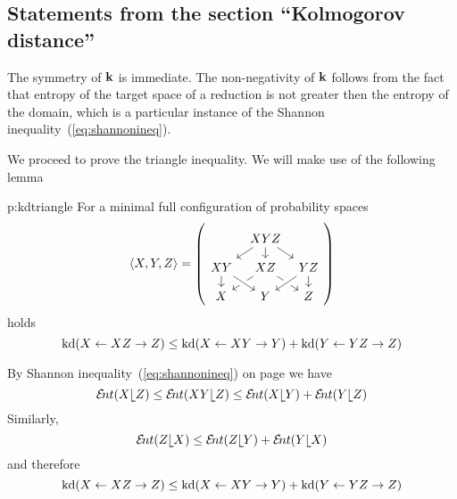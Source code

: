 



\def\thesubsection{\thesection.\ref{s:kolmogorov}}
\subsection{Statements from the section ``Kolmogorov distance''}

\begin{Proof}
  The symmetry of $\operatorname{\mathbf{k}}$ is immediate. The non-negativity of $\operatorname{\mathbf{k}}$
  follows from the fact that entropy of the target space of a reduction
  is not greater then the entropy of the domain, which is a
  particular instance of the Shannon inequality~(\ref{eq:shannonineq}).

  We proceed to prove the triangle inequality. We will make use of the
  following lemma
  \begin{tlemma}{p:kdtriangle}
    For a minimal full configuration of probability spaces
    \[
    \<X,Y,Z>=
    \left(
    \begin{tikzcd}[row sep=small,column sep=tiny,ampersand replacement=\&]
      \mbox{}
      \&
      XYZ
      \arrow{dl}{}
      \arrow{d}{}
      \arrow{dr}{}
      \&
      \\
      XY
      \arrow{d}{}
      \&
      XZ
      \arrow{dr}{}
      \arrow{dl}{}
      \&
      YZ
      \arrow{d}{}
      \\
      X
      \&
      Y
      \arrow[leftarrow,crossing over]{ur}{}
      \arrow[leftarrow,crossing over]{ul}{}
      \&
      Z
    \end{tikzcd}
    \right)
    \] 
    holds
    \[
    \operatorname{\mathrm{kd}}(X\stackrel{}{\leftarrow} XZ\stackrel{}{\rightarrow} Z)
    \leq
    \operatorname{\mathrm{kd}}(X\stackrel{}{\leftarrow} XY\stackrel{}{\rightarrow} Y)
    +
    \operatorname{\mathrm{kd}}(Y\stackrel{}{\leftarrow} YZ\stackrel{}{\rightarrow} Z)
    \]
  \end{tlemma}
  
  \begin{Proof}
    By Shannon inequality~(\ref{eq:shannonineq}) on page
    \pageref{eq:shannonineq} we have
    \[ 
    \ent( X \rel Z ) 
    \leq 
    \ent(XY \rel Z) 
    \leq 
    \ent( X \rel Y ) + \ent (Y \rel Z) 
    \] 
    Similarly, 
    \[ 
    \ent(Z \rel X ) 
    \leq 
    \ent(Z \rel Y) + \ent (Y \rel X) 
    \] 
    and therefore 
    \[ 
    \operatorname{\mathrm{kd}}(X\stackrel{}{\leftarrow} XZ\stackrel{}{\rightarrow} Z) 
    \leq 
    \operatorname{\mathrm{kd}}(X\stackrel{}{\leftarrow} XY\stackrel{}{\rightarrow} Y) 
    + 
    \operatorname{\mathrm{kd}}(Y\stackrel{}{\leftarrow} YZ\stackrel{}{\rightarrow} Z)  
    \]
  \end{Proof}


\end{Proof}

